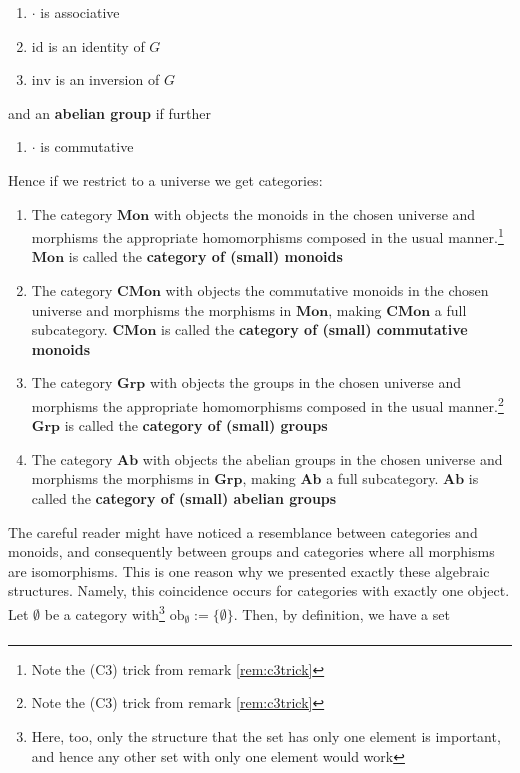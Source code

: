 \begin{exa}
\begin{enumerate}
\item[(G1)]
$\cdot$ is associative
\item[(G2)]
$\mathrm{id}$ is an identity of $G$
\item[(G3)]
$\mathrm{inv}$ is an inversion of $G$
\end{enumerate}
and an \textbf{abelian group} if further
\begin{enumerate}
\item[(Ab)]
$\cdot$ is commutative
\end{enumerate}
Hence if we restrict to a universe we get categories:
\begin{enumerate}
\item[$\bullet$]
The category $\mathbf{Mon}$ with objects the monoids in the chosen universe and morphisms the appropriate homomorphisms composed in the usual manner.\footnote{Note the (C3) trick from remark \ref{rem:c3trick}} $\mathbf{Mon}$ is called the \textbf{category of (small) monoids}
\item[$\bullet$]
The category $\mathbf{CMon}$ with objects the commutative monoids in the chosen universe and morphisms the morphisms in $\mathbf{Mon}$, making $\mathbf{CMon}$ a full subcategory.
$\mathbf{CMon}$ is called the \textbf{category of (small) commutative monoids}
\item[$\bullet$]
The category $\mathbf{Grp}$ with objects the groups in the chosen universe and morphisms the appropriate homomorphisms composed in the usual manner.\footnote{Note the (C3) trick from remark \ref{rem:c3trick}} $\mathbf{Grp}$ is called the \textbf{category of (small) groups}
\item[$\bullet$]
The category $\mathbf{Ab}$ with objects the abelian groups in the chosen universe and morphisms the morphisms in $\mathbf{Grp}$, making $\mathbf{Ab}$ a full subcategory.
$\mathbf{Ab}$ is called the \textbf{category of (small) abelian groups}
\end{enumerate}
The careful reader might have noticed a resemblance between categories and monoids, and consequently between groups and categories where all morphisms are isomorphisms.
This is one reason why we presented exactly these algebraic structures.
Namely, this coincidence occurs for categories with exactly one object.
Let $\pmb{\emptyset}$ be a category with\footnote{Here, too, only the structure that the set has only one element is important, and hence any other set with only one element would work} $\mathrm{ob}_{\pmb{\emptyset}} := \lbrace \emptyset \rbrace$.
Then, by definition, we have a set
\begin{align*}

\end{align*}
\end{exa}
